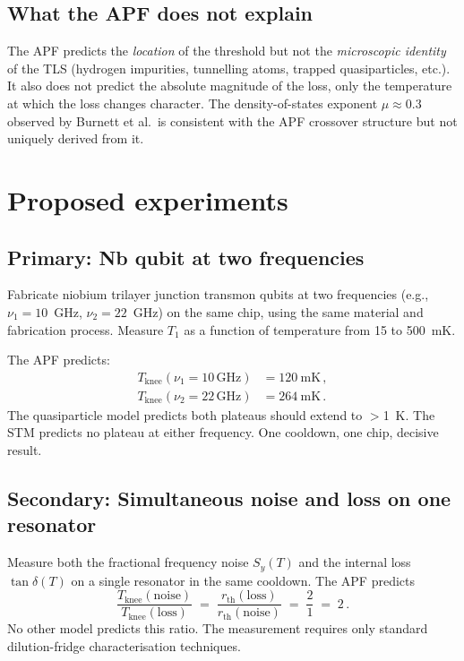 \documentclass[11pt]{article}
\begin{document}
\subsection{What the APF does not explain}

The APF predicts the \emph{location} of the threshold but not the \emph{microscopic identity} of the TLS (hydrogen impurities, tunnelling atoms, trapped quasiparticles, etc.).  It also does not predict the absolute magnitude of the loss, only the temperature at which the loss changes character.  The density-of-states exponent $\mu \approx 0.3$ observed by Burnett et al.\ is consistent with the APF crossover structure but not uniquely derived from it.


\section{Proposed experiments}

\subsection{Primary: Nb qubit at two frequencies}

Fabricate niobium trilayer junction transmon qubits at two frequencies (e.g., $\nu_1 = 10$~GHz, $\nu_2 = 22$~GHz) on the same chip, using the same material and fabrication process.  Measure $T_1$ as a function of temperature from 15 to 500~mK.

The APF predicts:
\begin{align}
T_{\mathrm{knee}}(\nu_1 = 10\,\mathrm{GHz}) &= 120~\mathrm{mK}\,,\\
T_{\mathrm{knee}}(\nu_2 = 22\,\mathrm{GHz}) &= 264~\mathrm{mK}\,.
\end{align}
The quasiparticle model predicts both plateaus should extend to $>$1~K.  The STM predicts no plateau at either frequency.  One cooldown, one chip, decisive result.

\subsection{Secondary: Simultaneous noise and loss on one resonator}

Measure both the fractional frequency noise $S_y(T)$ and the internal loss $\tan\delta(T)$ on a single resonator in the same cooldown.  The APF predicts
\begin{equation}
\frac{T_{\mathrm{knee}}(\mathrm{noise})}{T_{\mathrm{knee}}(\mathrm{loss})} \;=\; \frac{r_{\mathrm{th}}(\mathrm{loss})}{r_{\mathrm{th}}(\mathrm{noise})} \;=\; \frac{2}{1} \;=\; 2\,.
\end{equation}
No other model predicts this ratio.  The measurement requires only standard dilution-fridge characterisation techniques.
\end{document}
